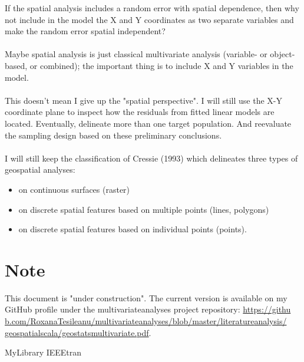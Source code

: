 \documentclass {article}
\begin{document}
 If the spatial analysis includes a random error with spatial dependence, then why not include in the model the X and Y coordinates as two separate variables and make the random error spatial independent?
\\
\\
Maybe spatial analysis is just classical multivariate analysis (variable- or object-based, or combined); the important thing is to include X and Y variables in the model.
\\
\\
This doesn't mean I give up the "spatial perspective". I will still use the X-Y coordinate plane to inspect how the residuals from fitted linear models are located. Eventually, delineate more than one target population. And reevaluate the sampling design based on these preliminary conclusions.
\\
\\
I will still keep the classification of Cressie (1993) which delineates three types of geospatial analyses:
\begin{itemize}
\item on continuous surfaces (raster)
\item on discrete spatial features based on multiple points (lines, polygons)
\item on discrete spatial features based on individual points (points).
\end{itemize}


\section* {Note}
This document is "under construction". The current version is available on my GitHub profile under the multivariate\underline{\space}analyses project repository: \href{https://github.com/RoxanaTesileanu/multivariate_analyses/blob/master/literature_analysis/geospatial_scala/geostats_multivariate.pdf}{https://githu\\b.com/RoxanaTesileanu/multivariate\underline{\space}analyses/blob/master/literature\underline{\space}analysis/\\geospatial\underline{\space}scala/geostats\underline{\space}multivariate.pdf}.

 {MyLibrary}
 {IEEEtran}
\end{document}
